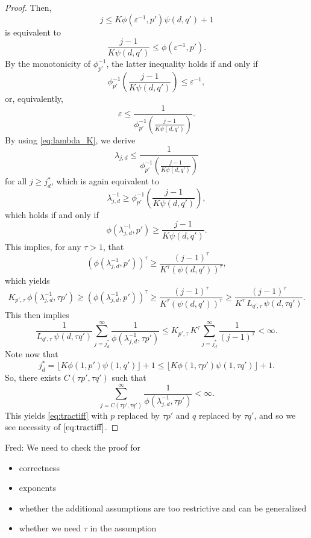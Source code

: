 \documentclass[11pt,a4paper]{article}
\newcommand{\fred}[1]{\begingroup\color{blue}Fred: #1\endgroup}
\begin{document}
\begin{proof}
Then, 
\[
j \le K \phi(\varepsilon^{-1},p')\psi(d,q') +1
\]
is equivalent to
\[
\frac{j-1}{K \psi(d,q')} \le \phi(\varepsilon^{-1},p').
\]
By the monotonicity of $\phi_{p'}^{-1}$, the latter inequality holds if and only if
\[
  \phi_{p'}^{-1} \left(\frac{j-1}{K \psi(d,q')} \right)
  \le \varepsilon^{-1},
\]
or, equivalently,
\[
 \varepsilon \le \frac{1}{\phi_{p'}^{-1} \left(\frac{j-1}{K \psi(d,q')} \right)}.
\]
By using \eqref{eq:lambda_K}, we derive
\[
 \lambda_{j,d}\le \frac{1}{\phi_{p'}^{-1} \left(\frac{j-1}{K \psi(d,q')} \right)}
\]
for all $j\ge j_d^*$, which is again equivalent to 
\[
\lambda_{j,d}^{-1}\ge \phi_{p'}^{-1} \left(\frac{j-1}{K \psi(d,q')} \right),
\]
which holds if and only if
\[ 
 \phi (\lambda_{j,d}^{-1}, p') \ge \frac{j-1}{K \psi(d,q')}.
\]
This implies, for any $\tau>1$, that 
\[ 
 (\phi (\lambda_{j,d}^{-1}, p'))^\tau \ge \frac{(j-1)^\tau}{K^\tau (\psi(d,q'))^\tau},
\]
which yields
\[ 
 K_{p',\tau}\, \phi (\lambda_{j,d}^{-1}, \tau p') \ge (\phi (\lambda_{j,d}^{-1}, p'))^\tau 
 \ge \frac{(j-1)^\tau}{K^\tau (\psi(d,q'))^\tau}\ge \frac{(j-1)^\tau}{K^\tau\, L_{q',\tau}\, \psi(d,\tau q')}.
\]
This then implies
\[
\frac{1}{L_{q',\tau}\, \psi(d,\tau q')} \sum_{j=j_d^*}^\infty \frac{1}{\phi (\lambda_{j,d}^{-1}, \tau p')} 
\le K_{p',\tau}\, K^\tau \sum_{j=j_d^*}^\infty \frac{1}{(j-1)^\tau}<\infty.
\]
Note now that
\[
 j_d^* = \lfloor K \phi(1,p')\psi (1,q')\rfloor +1 \le \lfloor K\phi(1,\tau p')\psi (1,\tau q')\rfloor +1.
\]
So, there exists $C(\tau p',\tau q')$ such that 
\[
 \sum_{j=C(\tau p',\tau q')}^\infty \frac{1}{\phi (\lambda_{j,d}^{-1}, \tau p')}<\infty.
\]
This yields \eqref{eq:tractiff} with $p$ replaced by $\tau p'$ and $q$ replaced by $\tau q'$, and so we see necessity of $\eqref{eq:tractiff}$. 

\end{proof}

\bigskip


\bigskip

\fred{We need to check the proof for 
\begin{itemize}
\item correctness
\item exponents
\item whether the additional assumptions are too restrictive and can be generalized
\item whether we need $\tau$ in the assumption
\end{itemize}}
\end{document}
